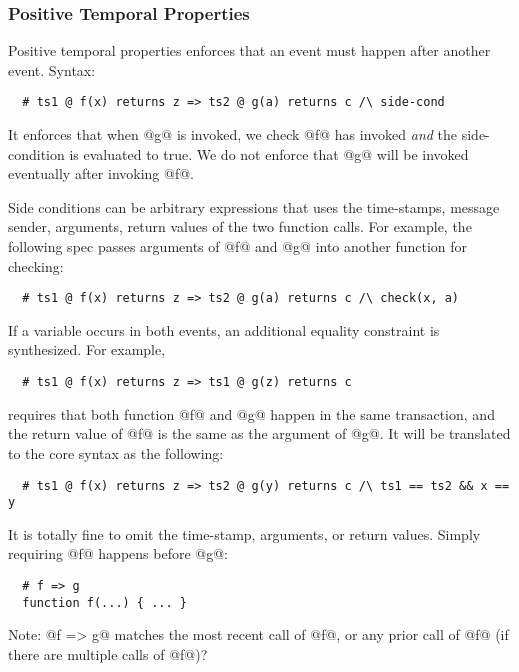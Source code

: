 \subsubsection{Positive Temporal Properties}

Positive temporal properties enforces that an event must happen
after another event. Syntax:
\begin{lstlisting}
  # ts1 @ f(x) returns z => ts2 @ g(a) returns c /\ side-cond
\end{lstlisting}
It enforces that when @g@ is invoked, we check @f@ has invoked \emph{and}
the side-condition is evaluated to true.
We do not enforce that @g@ will be invoked eventually after invoking @f@.

Side conditions can be arbitrary expressions that uses the time-stamps, message
sender, arguments, return values of the two function calls.
For example, the following spec passes arguments of @f@ and @g@ into
another function for checking:

\begin{lstlisting}
  # ts1 @ f(x) returns z => ts2 @ g(a) returns c /\ check(x, a)
\end{lstlisting}

If a variable occurs in both events, an additional equality constraint
is synthesized.  For example,
\begin{lstlisting}
  # ts1 @ f(x) returns z => ts1 @ g(z) returns c
\end{lstlisting}
requires that both function @f@ and @g@ happen in the same transaction,
and the return value of @f@ is the same as the argument of @g@.
It will be translated to the core syntax as the following:
\begin{lstlisting}
  # ts1 @ f(x) returns z => ts2 @ g(y) returns c /\ ts1 == ts2 && x == y
\end{lstlisting}

It is totally fine to omit the time-stamp, arguments, or return values.
Simply requiring @f@ happens before @g@:
\begin{lstlisting}
  # f => g
  function f(...) { ... }
\end{lstlisting}


Note: @f => g@ matches the most recent call of @f@,
or any prior call of @f@ (if there are multiple calls of @f@)?


